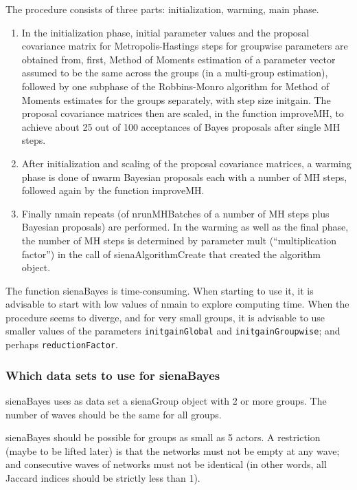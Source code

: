\documentclass[a4paper,fleqn,11pt]{article}
\newcommand{\+}{\, + \,}
\newcommand{\sfn}[1]{\textsf{#1}}
\begin{document}
  The procedure consists of three parts: initialization, warming,
  main phase.
  \begin{enumerate}
  \item
  In the initialization phase, initial parameter values and the proposal
  covariance matrix for Metropolis-Hastings steps for groupwise parameters
  are obtained from, first, Method of Moments estimation of a parameter vector
  assumed to be the same across the groups (in a multi-group estimation),
  followed by one subphase of the Robbins-Monro algorithm for Method of
  Moments estimates for the groups separately, with step size \sfn{initgain}.
  The proposal covariance matrices then are scaled, in the
  function \sfn{improveMH}, to achieve about 25 out of 100 acceptances of
  Bayes proposals after single MH steps.
  \item
  After initialization and scaling of the proposal covariance matrices,
  a warming phase is done of \sfn{nwarm} Bayesian proposals
  each with a number of MH steps, followed again by the function \sfn{improveMH}.
  \item
  Finally \sfn{nmain} repeats (of \sfn{nrunMHBatches} of a
  number of MH steps plus Bayesian proposals) are performed.
  In the warming as well as the final phase, the number of MH steps is
  determined by parameter \sfn{mult} (``multiplication factor'')
  in the call of \sfn{sienaAlgorithmCreate} that created the algorithm object.
\end{enumerate}  
  The function \sfn{sienaBayes} is time-consuming. When starting to use it, it is advisable
  to start with low values of \sfn{nmain} to explore computing time.
  When the procedure seems to diverge, and for very small groups, it is
  advisable to use smaller values of the parameters \texttt{initgainGlobal}
  and \texttt{initgainGroupwise}; and perhaps \texttt{reductionFactor}.


\subsubsection{Which data sets to use for sienaBayes}

\sfn{sienaBayes} uses as data set a \sfn{sienaGroup} object with 2 or more groups. 
The number of waves should be the same for all groups.

\sfn{sienaBayes} should be possible for groups as small as 5 actors. 
A restriction (maybe to be lifted later) is that the networks must not be 
empty at any wave; and consecutive waves of networks must not be identical 
(in other words, all Jaccard indices should be strictly less than 1).
\end{document}
